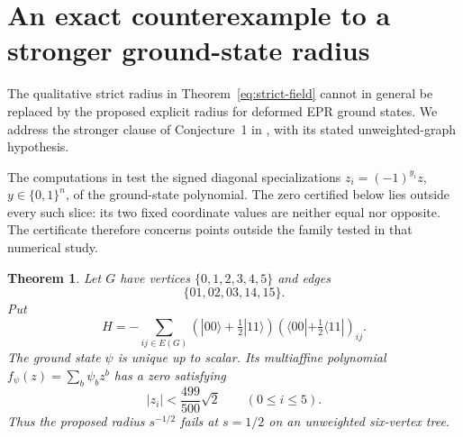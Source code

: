 \documentclass[reqno]{amsart}
\newtheorem{theorem}{Theorem}[section]
\theoremstyle{definition}
\theoremstyle{remark}
\begin{document}
\section{An exact counterexample to a stronger ground-state radius}\label{cx:section}

The qualitative strict radius in Theorem~\ref{eq:strict-field} cannot
in general be replaced by the proposed explicit radius for deformed
EPR ground states. We address the stronger clause of Conjecture~1 in
\cite[Section 5.4]{WBG26}, with its stated unweighted-graph hypothesis.

The computations in \cite[Numerical Study~1, equation~(70)]{WBG26}
test the signed diagonal specializations $z_i=(-1)^{y_i}z$,
$y\in\{0,1\}^n$, of the ground-state polynomial. The zero certified
below lies outside every such slice: its two fixed coordinate values
are neither equal nor opposite. The certificate therefore concerns
points outside the family tested in that numerical study.

\begin{theorem}\label{cx:epr}
Let $G$ have vertices $\{0,1,2,3,4,5\}$ and edges
\[
 \{01,02,03,14,15\}.
\]
Put
\[
 H=-\sum_{ij\in E(G)}
 (|00\rangle+\tfrac12|11\rangle)
 (\langle00|+\tfrac12\langle11|)_{ij}.
\]
The ground state $\psi$ is unique up to scalar. Its multiaffine
polynomial $f_\psi(z)=\sum_b\psi_bz^b$ has a zero satisfying
\[
 |z_i|<\frac{499}{500}\sqrt2\qquad(0\leq i\leq5).
\]
Thus the proposed radius $s^{-1/2}$ fails at $s=1/2$ on an
unweighted six-vertex tree.
\end{theorem}
\end{document}
